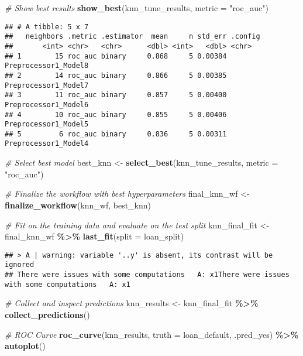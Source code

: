 \documentclass[
]{article}
\newenvironment{Shaded}{\begin{snugshade}}{\end{snugshade}}
\newcommand{\AttributeTok}[1]{\textcolor[rgb]{0.13,0.29,0.53}{#1}}
\newcommand{\CommentTok}[1]{\textcolor[rgb]{0.56,0.35,0.01}{\textit{#1}}}
\newcommand{\FunctionTok}[1]{\textcolor[rgb]{0.13,0.29,0.53}{\textbf{#1}}}
\newcommand{\NormalTok}[1]{#1}
\newcommand{\OtherTok}[1]{\textcolor[rgb]{0.56,0.35,0.01}{#1}}
\newcommand{\SpecialCharTok}[1]{\textcolor[rgb]{0.81,0.36,0.00}{\textbf{#1}}}
\newcommand{\StringTok}[1]{\textcolor[rgb]{0.31,0.60,0.02}{#1}}
\begin{document}
\begin{Shaded}
\begin{Highlighting}[]
\CommentTok{\# Show best results}
\FunctionTok{show\_best}\NormalTok{(knn\_tune\_results, }\AttributeTok{metric =} \StringTok{"roc\_auc"}\NormalTok{)}
\end{Highlighting}
\end{Shaded}

\begin{verbatim}
## # A tibble: 5 x 7
##   neighbors .metric .estimator  mean     n std_err .config             
##       <int> <chr>   <chr>      <dbl> <int>   <dbl> <chr>               
## 1        15 roc_auc binary     0.868     5 0.00384 Preprocessor1_Model8
## 2        14 roc_auc binary     0.866     5 0.00385 Preprocessor1_Model7
## 3        11 roc_auc binary     0.857     5 0.00400 Preprocessor1_Model6
## 4        10 roc_auc binary     0.855     5 0.00406 Preprocessor1_Model5
## 5         6 roc_auc binary     0.836     5 0.00311 Preprocessor1_Model4
\end{verbatim}

\begin{Shaded}
\begin{Highlighting}[]
\CommentTok{\# Select best model}
\NormalTok{best\_knn }\OtherTok{\textless{}{-}} \FunctionTok{select\_best}\NormalTok{(knn\_tune\_results, }\AttributeTok{metric =} \StringTok{"roc\_auc"}\NormalTok{)}

\CommentTok{\# Finalize the workflow with best hyperparameters}
\NormalTok{final\_knn\_wf }\OtherTok{\textless{}{-}} \FunctionTok{finalize\_workflow}\NormalTok{(knn\_wf, best\_knn)}

\CommentTok{\# Fit on the training data and evaluate on the test split}
\NormalTok{knn\_final\_fit }\OtherTok{\textless{}{-}}\NormalTok{ final\_knn\_wf }\SpecialCharTok{\%\textgreater{}\%}
  \FunctionTok{last\_fit}\NormalTok{(}\AttributeTok{split =}\NormalTok{ loan\_split)}
\end{Highlighting}
\end{Shaded}

\begin{verbatim}
## > A | warning: variable '..y' is absent, its contrast will be ignored
## There were issues with some computations   A: x1There were issues with some computations   A: x1
\end{verbatim}

\begin{Shaded}
\begin{Highlighting}[]
\CommentTok{\# Collect and inspect predictions}
\NormalTok{knn\_results }\OtherTok{\textless{}{-}}\NormalTok{ knn\_final\_fit }\SpecialCharTok{\%\textgreater{}\%} \FunctionTok{collect\_predictions}\NormalTok{()}

\CommentTok{\# ROC Curve}
\FunctionTok{roc\_curve}\NormalTok{(knn\_results, }\AttributeTok{truth =}\NormalTok{ loan\_default, .pred\_yes) }\SpecialCharTok{\%\textgreater{}\%} \FunctionTok{autoplot}\NormalTok{()}
\end{Highlighting}
\end{Shaded}
\end{document}
